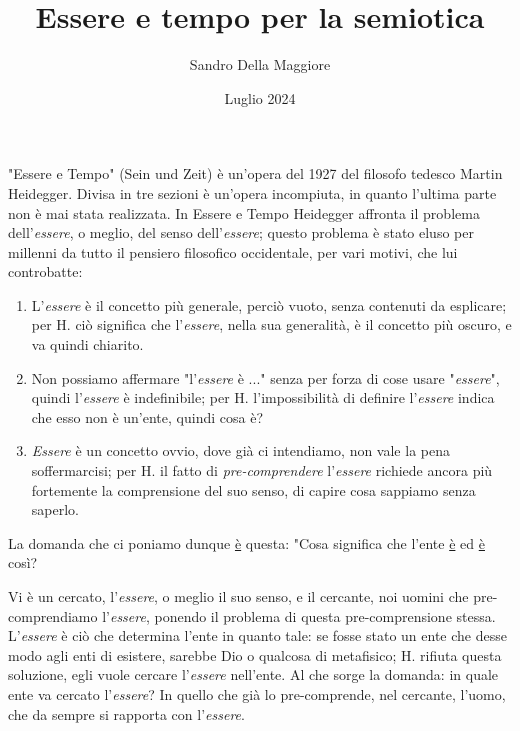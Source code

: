 \documentclass[a4paper,12pt,oneside]{article}%
\begin{document}
	\author{Sandro Della Maggiore}
	\title{Essere e tempo per la semiotica}
	\date{Luglio 2024}
	
	\maketitle


"Essere e Tempo" (Sein und Zeit) è un’opera del 1927 del filosofo tedesco Martin Heidegger. Divisa in tre sezioni è un’opera incompiuta, in quanto l’ultima parte non è mai stata realizzata. In Essere e Tempo Heidegger affronta il problema dell’\textit{essere}, o meglio, del senso dell'\textit{essere}; questo problema è stato eluso per millenni da tutto il pensiero filosofico occidentale, per vari motivi, che lui controbatte:

\begin{enumerate}
	\item L'\textit{essere} è il concetto più generale, perciò vuoto, senza contenuti da esplicare; per H. ciò significa che l'\textit{essere}, nella sua generalità, è il concetto più oscuro, e va quindi chiarito.
	\item Non possiamo affermare "l'\textit{essere} è ..." senza per forza di cose usare "\textit{essere}", quindi l'\textit{essere} è indefinibile; per H. l'impossibilità di definire l'\textit{essere} indica che esso non è un'ente, quindi cosa è?
	\item \textit{Essere} è un concetto ovvio, dove già ci intendiamo, non vale la pena soffermarcisi; per H. il fatto di \textit{pre-comprendere} l'\textit{essere} richiede ancora più fortemente la comprensione del suo senso, di capire cosa sappiamo senza saperlo.
\end{enumerate}

La domanda che ci poniamo dunque \underline{è} questa: "Cosa significa che l'ente \underline{è} ed \underline{è} così?

Vi è un cercato, l'\textit{essere}, o meglio il suo senso, e il cercante, noi uomini che pre-comprendiamo l'\textit{essere}, ponendo il problema di questa pre-comprensione stessa. L'\textit{essere} è ciò che determina l'ente in quanto tale: se fosse stato un ente che desse modo agli enti di esistere, sarebbe Dio o qualcosa di metafisico; H. rifiuta questa soluzione, egli vuole cercare l'\textit{essere} nell'ente. Al che sorge la domanda: in quale ente va cercato l'\textit{essere}? In quello che già lo pre-comprende, nel cercante, l'uomo, che da sempre si rapporta con l'\textit{essere}.
\end{document}
